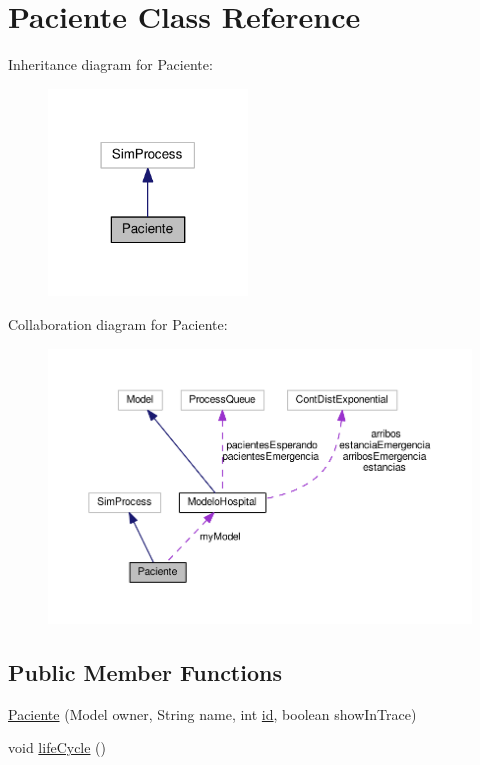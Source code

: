 \hypertarget{class_paciente}{\section{Paciente Class Reference}
\label{class_paciente}
}


Inheritance diagram for Paciente\-:\nopagebreak
\begin{figure}[H]
\begin{center}
\leavevmode
\includegraphics[width=150pt]{class_paciente__inherit__graph}
\end{center}
\end{figure}


Collaboration diagram for Paciente\-:\nopagebreak
\begin{figure}[H]
\begin{center}
\leavevmode
\includegraphics[width=350pt]{class_paciente__coll__graph}
\end{center}
\end{figure}
\subsection*{Public Member Functions}
\begin{DoxyCompactItemize}
\item 
\hyperlink{class_paciente_a8723f0581634a743752975514669c29b}{Paciente} (Model owner, String name, int \hyperlink{class_paciente_aa05bc33a654eef666530777484f07604}{id}, boolean show\-In\-Trace)
\item 
void \hyperlink{class_paciente_ac58de1ac716ab3f57e24b82a670c29d5}{life\-Cycle} ()
\end{DoxyCompactItemize}
